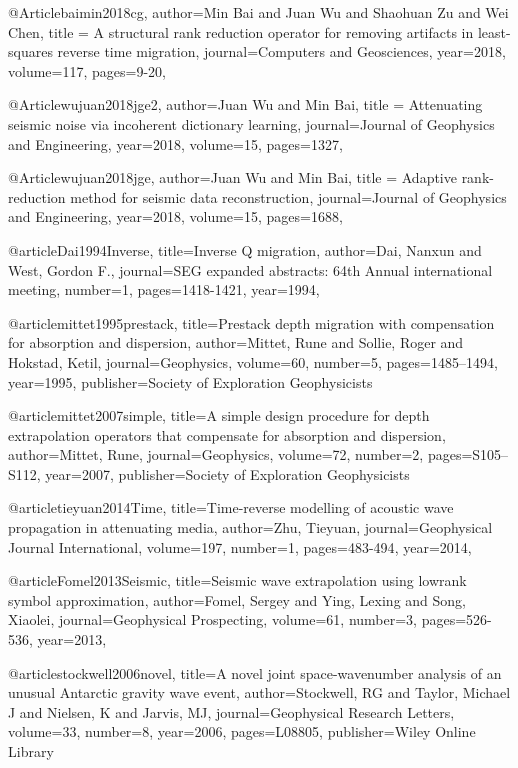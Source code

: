 @Article{baimin2018cg,
  author={Min Bai and Juan Wu and Shaohuan Zu and Wei Chen},
  title = {A structural rank reduction operator for removing artifacts in least-squares reverse time migration},
  journal={Computers and Geosciences},
  year=2018,
  volume=117,
  pages={9-20},
}

@Article{wujuan2018jge2,
  author={Juan Wu and Min Bai},
  title = {Attenuating seismic noise via incoherent dictionary learning},
  journal={Journal of Geophysics and Engineering},
  year=2018,
  volume=15,
  pages={1327},
}

@Article{wujuan2018jge,
  author={Juan Wu and Min Bai},
  title = {Adaptive rank-reduction method for seismic data reconstruction},
  journal={Journal of Geophysics and Engineering},
  year=2018,
  volume=15,
  pages={1688},
}



@article{Dai1994Inverse,
  title={Inverse {Q} migration},
  author={Dai, Nanxun and West, Gordon F.},
  journal={SEG expanded abstracts: 64th Annual international meeting},
  number={1},
  pages={1418-1421},
  year={1994},
}

@article{mittet1995prestack,
  title={Prestack depth migration with compensation for absorption and dispersion},
  author={Mittet, Rune and Sollie, Roger and Hokstad, Ketil},
  journal={Geophysics},
  volume={60},
  number={5},
  pages={1485--1494},
  year={1995},
  publisher={Society of Exploration Geophysicists}
}

@article{mittet2007simple,
  title={A simple design procedure for depth extrapolation operators that compensate for absorption and dispersion},
  author={Mittet, Rune},
  journal={Geophysics},
  volume={72},
  number={2},
  pages={S105--S112},
  year={2007},
  publisher={Society of Exploration Geophysicists}
}

@article{tieyuan2014Time,
  title={Time-reverse modelling of acoustic wave propagation in attenuating media},
  author={Zhu, Tieyuan},
  journal={Geophysical Journal International},
  volume={197},
  number={1},
  pages={483-494},
  year={2014},
}

@article{Fomel2013Seismic,
  title={Seismic wave extrapolation using lowrank symbol approximation},
  author={Fomel, Sergey and Ying, Lexing and Song, Xiaolei},
  journal={Geophysical Prospecting},
  volume={61},
  number={3},
  pages={526-536},
  year={2013},
}

@article{stockwell2006novel,
  title={A novel joint space-wavenumber analysis of an unusual Antarctic gravity wave event},
  author={Stockwell, RG and Taylor, Michael J and Nielsen, K and Jarvis, MJ},
  journal={Geophysical Research Letters},
  volume={33},
  number={8},
  year={2006},
  pages={L08805},
  publisher={Wiley Online Library}
}

